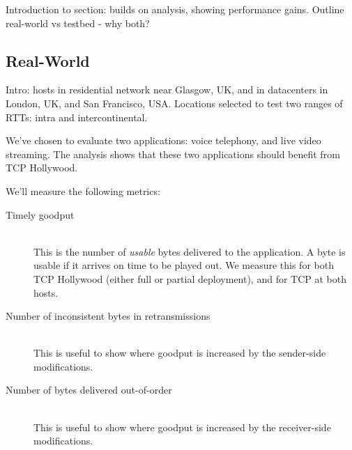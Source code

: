 

Introduction to section: builds on analysis, showing performance gains.
Outline real-world vs testbed - why both?

\subsection{Real-World}
\label{sec:perf:realworld}

Intro: hosts in residential network near Glasgow, UK, and in datacenters in
London, UK, and San Francisco, USA. Locations selected to test two ranges
of RTTs: intra and intercontinental.

We've chosen to evaluate two applications: voice telephony, and live video
streaming. The analysis shows that these two applications should benefit
from TCP Hollywood.

We'll measure the following metrics:

\begin{description}
  \item[Timely goodput] \hfill \\
  This is the number of \textit{usable} bytes delivered to the application.
  A byte is usable if it arrives on time to be played out. We measure this
  for both TCP Hollywood (either full or partial deployment), and for TCP
  at both hosts.
  \item[Number of inconsistent bytes in retransmissions] \hfill \\
  This is useful to show where goodput is increased by the sender-side
  modifications.
  \item[Number of bytes delivered out-of-order] \hfill \\
  This is useful to show where goodput is increased by the receiver-side
  modifications.
\end{description}


